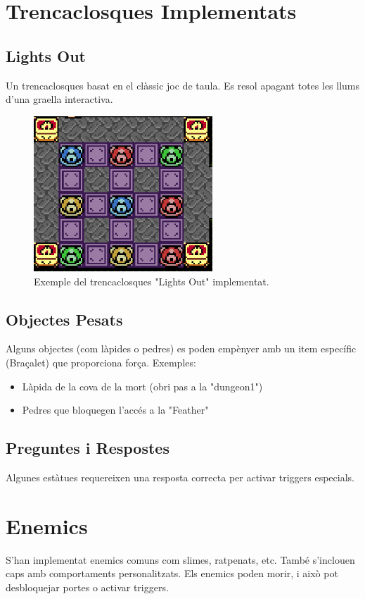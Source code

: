 \documentclass[a4paper,12pt]{article}
\begin{document}
\section{Trencaclosques Implementats}

\subsection{Lights Out}
Un trencaclosques basat en el clàssic joc de taula. Es resol apagant totes les llums d'una graella interactiva.

\begin{figure}[ht!]
    \centering
    \includegraphics[width=0.6\textwidth]{../imgs/exemple-trencaclosques.png}
    \caption{Exemple del trencaclosques "Lights Out" implementat.}
    \label{fig:exemple-trencaclosques}
\end{figure}

\subsection{Objectes Pesats}
Alguns objectes (com làpides o pedres) es poden empènyer amb un item específic (Braçalet) que proporciona força. Exemples:
\begin{itemize}
    \item Làpida de la cova de la mort (obri pas a la "dungeon1")
    \item Pedres que bloquegen l'accés a la "Feather"
\end{itemize}

\subsection{Preguntes i Respostes}
Algunes estàtues requereixen una resposta correcta per activar triggers especials.

\section{Enemics}
S'han implementat enemics comuns com slimes, ratpenats, etc. També s'inclouen caps amb comportaments personalitzats. Els enemics poden morir, i això pot desbloquejar portes o activar triggers.
\end{document}
